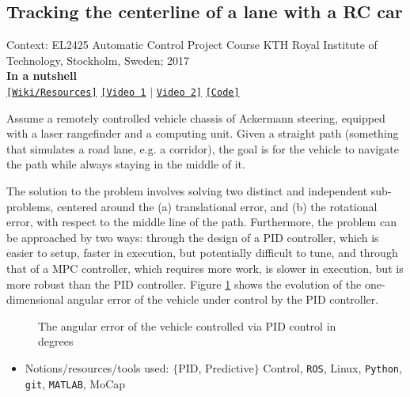 \subsection{Tracking the centerline of a lane with a RC car}

\noindent Context: EL2425 Automatic Control Project Course
\noindent KTH Royal Institute of Technology, Stockholm, Sweden; 2017\\

\noindent \textbf{In a nutshell}\\
\noindent \href{https://github.com/li9i/HT16_P2_EL2425_resources}{\texttt{[Wiki/Resources]}} \href{https://www.youtube.com/watch?v=w3Wnw5SLmss}{\texttt{[Video 1}} $|$ \href{https://youtu.be/937OZez1iN8?t=142}{\texttt{Video 2]}} \href{https://github.com/li9i/HT16_P2_EL2425}{\texttt{[Code]}}\\

\begin{problem}
Assume a remotely controlled vehicle chassis of Ackermann
steering, equipped with a laser rangefinder and a computing unit. Given a
straight path (something that simulates a road lane, e.g. a corridor), the goal
is for the vehicle to navigate the path while always staying in the middle of it.
\end{problem}

The solution to the problem involves solving two distinct and independent
sub-problems, centered around the (a) translational error, and (b) the
rotational error, with respect to the middle line of the path. Furthermore, the
problem can be approached by two ways: through the design of a PID controller,
which is easier to setup, faster in execution, but potentially difficult to
tune, and through that of a MPC controller, which requires more work, is slower
in execution, but is more robust than the PID controller. Figure
\ref{fig:centerline_pid_error} shows the evolution of the one-dimensional
angular error of the vehicle under control by the PID controller.

\begin{figure}[H]\centering
  \scalebox{0.6}{}
  \caption{\small The angular error of the vehicle controlled via PID control
           in degrees}
  \label{fig:centerline_pid_error}
\end{figure}

\vspace{-0.5cm}

\begin{itemize}
  \item Notions/resources/tools used: $\{$PID, Predictive$\}$ Control, \texttt{ROS},  Linux, \texttt{Python}, \texttt{git}, \texttt{MATLAB}, MoCap
\end{itemize}
